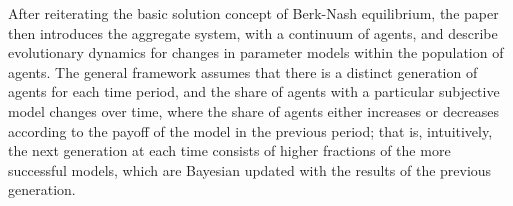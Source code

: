\documentclass[10pt,letter]{article}
\begin{document}

After reiterating the basic solution concept of Berk-Nash equilibrium, the paper then introduces the aggregate system, with a continuum of agents, and describe evolutionary dynamics for changes in parameter models within the population of agents. The general framework assumes that there is a distinct generation of agents for each time period, and the share of agents with a particular subjective model changes over time, where the share of agents either increases or decreases according to the payoff of the model in the previous period; that is, intuitively, the next generation at each time consists of higher fractions of the more successful models, which are Bayesian updated with the results of the previous generation.
\end{document}

